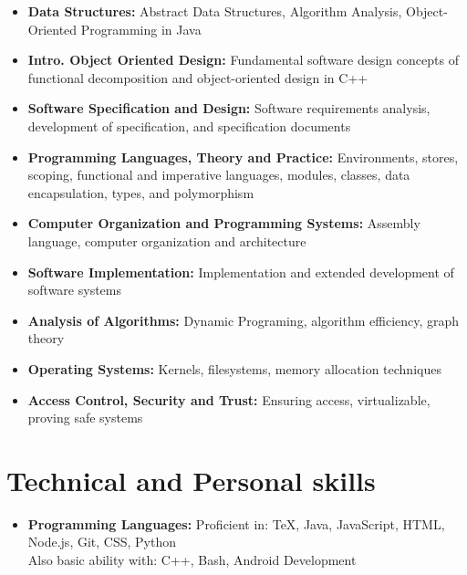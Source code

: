 \documentclass[11pt,a4paper,roman]{moderncv}        %
\begin{document}
\begin{itemize}

  \item{\textbf{Data Structures:} Abstract Data Structures, Algorithm Analysis, Object-Oriented Programming in Java}
  \item{\textbf{Intro. Object Oriented Design:} Fundamental software design concepts of functional decomposition and object-oriented design in C++}
  \item{\textbf{Software Specification and Design:} Software requirements analysis, development of specification, and specification documents}
  \item{\textbf{Programming Languages, Theory and Practice:} Environments, stores, scoping, functional and imperative languages, modules, classes, data encapsulation, types, and polymorphism}
  \item{\textbf{Computer Organization and Programming Systems:} Assembly language, computer organization and architecture}
  \item{\textbf{Software Implementation:} Implementation and extended development of software systems}
  \item{\textbf{Analysis of Algorithms:} Dynamic Programing, algorithm efficiency, graph theory}
  \item{\textbf{Operating Systems:} Kernels, filesystems, memory allocation techniques}
  \item{\textbf{Access Control, Security and Trust:} Ensuring access, virtualizable, proving safe systems}

\end{itemize}

\vspace{2pt}

\section{Technical and Personal skills}

\vspace{2pt}

\begin{itemize}

\item \textbf{Programming Languages:} Proficient in: TeX, Java, JavaScript, HTML, Node.js, Git, CSS, Python \\ Also basic ability with: C++, Bash, Android Development

\vspace{2pt}

\end{itemize}
\end{document}

